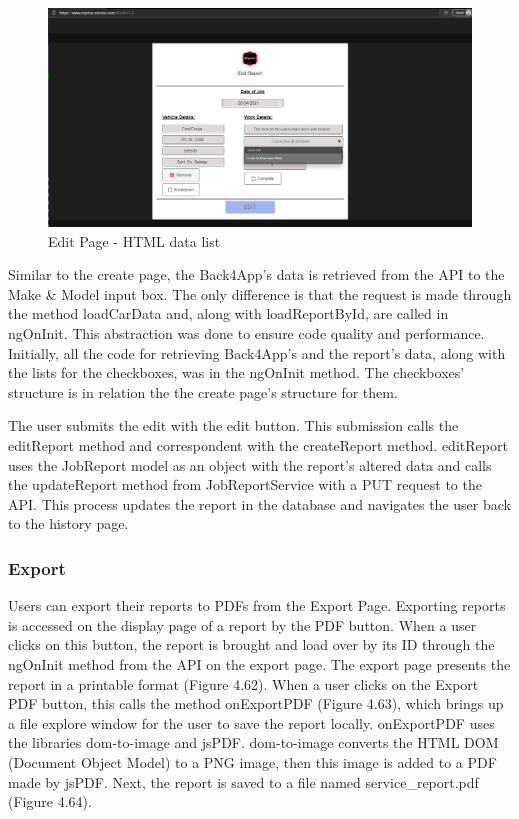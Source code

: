 \begin{figure}[H]
    \centering
    \caption{Edit Page - HTML data list}
    \label{image:EditHTMLdatalist}
    \includegraphics[width=1.0\textwidth]{images/repota/UI/edit-page.png}
\end{figure}

Similar to the create page, the Back4App's data is retrieved from the API to the Make \& Model input box. The only difference is that the request is made through the method loadCarData and, along with loadReportById, are called in ngOnInit. This abstraction was done to ensure code quality and performance. Initially, all the code for retrieving Back4App's and the report's data, along with the lists for the checkboxes, was in the ngOnInit method. The checkboxes' structure is in relation the the create page's structure for them.

The user submits the edit with the edit button. This submission calls the editReport method and correspondent with the createReport method. editReport uses the JobReport model as an object with the report's altered data and calls the updateReport method from JobReportService with a PUT request to the API. This process updates the report in the database and navigates the user back to the history page.

\subsubsection{Export}
Users can export their reports to PDFs from the Export Page. Exporting reports is accessed on the display page of a report by the PDF button. When a user clicks on this button, the report is brought and load over by its ID through the ngOnInit method from the API on the export page. The export page presents the report in a printable format (Figure 4.62). When a user clicks on the Export PDF button, this calls the method onExportPDF (Figure 4.63), which brings up a file explore window for the user to save the report locally. onExportPDF uses the libraries dom-to-image and jsPDF. dom-to-image converts the HTML DOM (Document Object Model) to a PNG image, then this image is added to a PDF made by jsPDF. Next, the report is saved to a file named service\_report.pdf (Figure 4.64).

